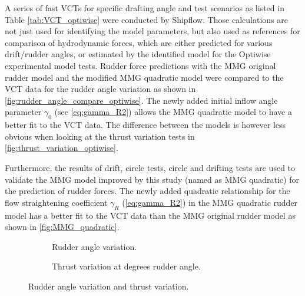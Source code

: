 \noindent A series of fast VCTs for specific drafting angle and test scenarios as listed in Table \ref{tab:VCT_optiwise} were conducted by Shipflow. Those calculations are not just used for identifying the model parameters, but also used as references for comparison of hydrodynamic forces, which are either predicted for various drift/rudder angles, or estimated by the identified model for the Optiwise experimental model tests. Rudder force predictions with the MMG original rudder model and the modified MMG quadratic model were compared to the VCT data for the rudder angle variation as shown in \autoref{fig:rudder_angle_compare_optiwise}. The newly added initial inflow angle parameter $\gamma_0$ (see \autoref{eq:gamma_R2}) allows the MMG quadratic model to have a better fit to the VCT data. The difference between the models is however less obvious when looking at the thrust variation tests in \autoref{fig:thrust_variation_optiwise}.

Furthermore, the results of drift, circle tests, circle and drifting tests are used to validate the MMG model improved by this study (named as MMG quadratic) for the prediction of rudder forces.
The newly added quadratic relationship for the flow straightening coefficient $\gamma_R$ (\autoref{eq:gamma_R2}) in the MMG quadratic rudder model has a better fit to the VCT data than the MMG original rudder model as shown in \autoref{fig:MMG_quadratic}.

\begin{figure}[h]
     \centering
     \begin{subfigure}[b]{0.49\textwidth}
         \centering
         
        \caption{Rudder angle variation.}
        \label{fig:rudder_angle_compare_optiwise}
     \end{subfigure}
     \hfill
     \begin{subfigure}[b]{0.49\textwidth}
         \centering
         
        \caption{Thrust variation at  degrees rudder angle.}
        \label{fig:thrust_variation_optiwise}
     \end{subfigure}
    \caption{Rudder angle variation and thrust variation.}
    \label{fig:rudder_angle_compare_optiwise_all}
\end{figure}



